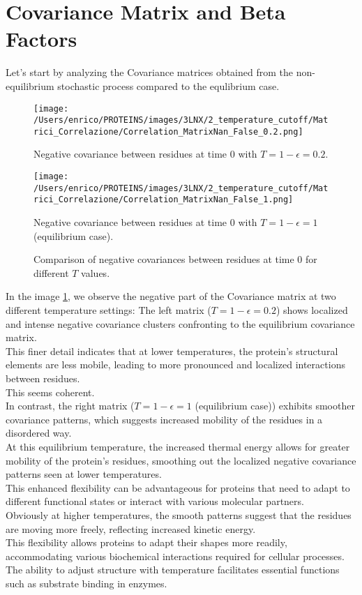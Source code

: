 \documentclass[English, Lau, oneside]{sapthesis}
\begin{document}
\section{Covariance Matrix and Beta Factors}
\noindent 
Let's start by analyzing the Covariance matrices obtained from the non-equilibrium stochastic process compared to the equlibrium case.\\
\begin{figure}[h!]
    \centering
    \begin{minipage}{0.49\textwidth}
        \centering
        \texttt{[image: /Users/enrico/PROTEINS/images/3LNX/2\_temperature\_cutoff/Matrici\_Correlazione/Correlation\_MatrixNan\_False\_0.2.png]}
        \caption{Negative covariance between residues at time 0 with \( T = 1-\epsilon = 0.2\).}
    \end{minipage}
    \hfill
    \begin{minipage}{0.49\textwidth}
        \centering
        \texttt{[image: /Users/enrico/PROTEINS/images/3LNX/2\_temperature\_cutoff/Matrici\_Correlazione/Correlation\_MatrixNan\_False\_1.png]}
        \caption{Negative covariance between residues at time 0 with \( T = 1-\epsilon =1\) (equilibrium case).}
    \end{minipage}
    \caption{Comparison of negative covariances between residues at time 0 for different $T$ values.}
    \label{fig:Covariance_comparison_out}
\end{figure}
In the image \ref{fig:Covariance_comparison_out}, we observe the negative part of the Covariance matrix at two different temperature settings:
The left matrix (\( T = 1-\epsilon = 0.2\)) shows localized and intense negative covariance clusters confronting to the equilibrium covariance matrix.\\
This finer detail indicates that at lower temperatures, the protein's structural elements are less mobile, leading to more pronounced and localized interactions between residues.\\
This seems coherent.\\
In contrast, the right matrix (\( T = 1-\epsilon =1\) (equilibrium case)) exhibits smoother covariance patterns, which suggests increased mobility of the residues in a disordered way.\\
At this equilibrium temperature, the increased thermal energy allows for greater mobility of the protein's residues, smoothing out the localized negative covariance patterns seen at lower temperatures.\\
This enhanced flexibility can be advantageous for proteins that need to adapt to different functional states or interact with various molecular partners.\\
Obviously at higher temperatures, the smooth patterns suggest that the residues are moving more freely, reflecting increased kinetic energy.\\
This flexibility allows proteins to adapt their shapes more readily, accommodating various biochemical interactions required for cellular processes.\\
The ability to adjust structure with temperature facilitates essential functions such as substrate binding in enzymes.\\
\end{document}
